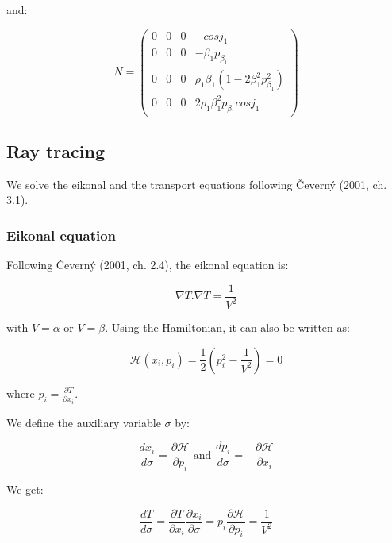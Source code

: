 \documentclass[main.tex]{subfiles}
\begin{document}
and:

\begin{equation}
N = \begin{pmatrix}
0 & 0 & 0 & - cos j_1 \\
0 & 0 & 0 & - \beta_1 p_{\beta_1} \\
0 & 0 & 0 & \rho_1 \beta_1 (1 - 2 \beta_1^2 p_{\beta_1}^2) \\
0 & 0 & 0 & 2 \rho_1 \beta_1^2 p_{\beta_1} cos j_1
\end{pmatrix}
\end{equation}

\subsection{Ray tracing}

We solve the eikonal and the transport equations following \v Cevern\'y (2001, ch. 3.1).

\subsubsection{Eikonal equation}

Following \v Cevern\'y (2001, ch. 2.4), the eikonal equation is:

\begin{equation}
\nabla T . \nabla T = \frac{1}{V^2}
\end{equation}

with $V = \alpha$ or $V= \beta$. Using the Hamiltonian, it can also be written as:

\begin{equation}
\mathcal H (x_i, p_i) = \frac{1}{2} (p_i^2 - \frac{1}{V^2}) = 0
\end{equation}

where $p_i = \frac{\partial T}{\partial x_i}$.

We define the auxiliary variable $\sigma$ by:

\begin{equation}
\frac{dx_i}{d\sigma} = \frac{\partial \mathcal H}{\partial p_i} \text{ and } \frac{dp_i}{d\sigma} = - \frac{\partial \mathcal H}{\partial x_i}
\end{equation}

We get:

\begin{equation}
\frac{dT}{d\sigma} = \frac{\partial T}{\partial x_i} \frac{\partial x_i}{\partial \sigma} = p_i \frac{\partial \mathcal H}{\partial p_i} = \frac{1}{V^2}
\end{equation}
\end{document}
